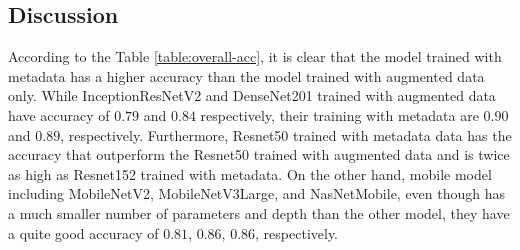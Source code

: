 \documentclass[sensors,article,submit,pdftex,moreauthors]{Definitions/mdpi}
\begin{document}
\subsection{Discussion} 

According to the Table \ref{table:overall-acc}, it is clear that the model trained with metadata has a higher accuracy than the model trained with augmented data only. While InceptionResNetV2 and DenseNet201 trained with augmented data have accuracy of $0.79$ and $0.84$ respectively, their training with metadata are $0.90$ and $0.89$, respectively. Furthermore, Resnet50 trained with metadata data has the accuracy that outperform the Resnet50 trained with augmented data and is twice as high as Resnet152 trained with metadata. On the other hand, mobile model including MobileNetV2, MobileNetV3Large, and NasNetMobile, even though has a much smaller number of parameters and depth than the other model, they have a quite good accuracy of $0.81$, $0.86$, $0.86$, respectively. 
\end{document}
